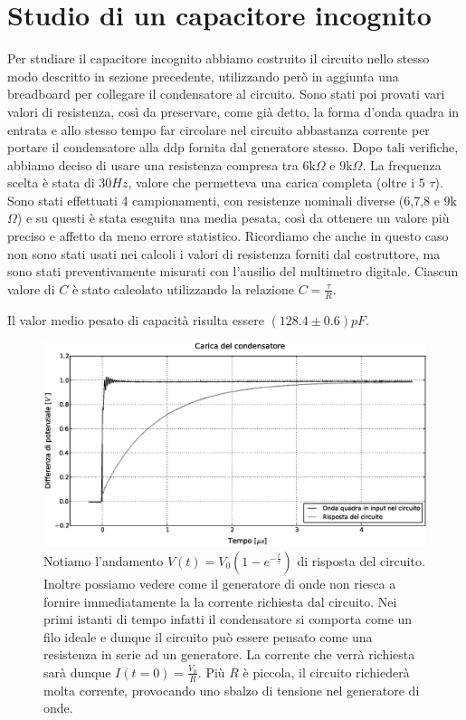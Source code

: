 \section{Studio di un capacitore incognito}
Per studiare il capacitore incognito abbiamo costruito il circuito nello stesso modo descritto in sezione precedente, utilizzando però in aggiunta una breadboard per collegare il condensatore al circuito. Sono stati poi provati vari valori di resistenza, così da preservare, come già detto, la forma d'onda quadra in entrata e allo stesso tempo far circolare nel circuito abbastanza corrente per portare il condensatore alla ddp fornita dal generatore stesso. Dopo tali verifiche, abbiamo deciso di usare una resistenza compresa tra $6$k$\Omega$ e $9$k$\Omega$. La frequenza scelta è stata di $30Hz$, valore che permetteva una carica completa (oltre i 5 $\tau$). Sono stati effettuati 4 campionamenti, con resistenze nominali diverse (6,7,8 e 9k$\Omega$) e su questi è stata eseguita una media pesata, così da ottenere un valore più preciso e affetto da meno errore statistico.
Ricordiamo che anche in questo caso non sono stati usati nei calcoli i valori di resistenza forniti dal costruttore, ma sono stati preventivamente misurati con l'ausilio del multimetro digitale. Ciascun valore di $C$ è stato calcolato utilizzando la relazione $C=\frac{\tau}{R}$.

Il valor medio pesato di capacità risulta essere $(128.4\pm0.6) pF$. 

\begin{figure}[h!]
    \centering
        \includegraphics[width=0.8 \textwidth]{figure3.eps}%
        \caption{Notiamo l'andamento $V(t)=V_0(1-e^{-\frac{t}{\tau}})$ di risposta del circuito. Inoltre possiamo vedere come il generatore di onde non riesca a fornire immediatamente la la corrente richiesta dal circuito. Nei primi istanti di tempo infatti il condensatore si comporta come un filo ideale e dunque il circuito può essere pensato come una resistenza in serie ad un generatore. La corrente che verrà richiesta sarà dunque $I(t=0)=\frac{V_0}{R}$. Più $R$ è piccola, il circuito richiederà molta corrente, provocando uno sbalzo di tensione nel generatore di onde. }
        \label{fig:1}
\end{figure}